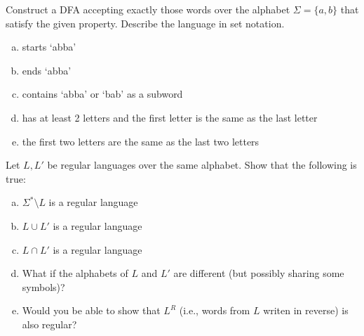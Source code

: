 \documentclass[a4paper,12pt]{amsart}
\begin{document}
\medskip\begin{problem}

    Construct a DFA accepting exactly those words over the alphabet $\Sigma=\{a,b\}$ that satisfy the given property. Describe the language in set notation.

    \medskip
    
    \begin{enumerate}[(a)]\setlength\itemsep{12pt}
        \item starts `abba'
        \item ends `abba'
        \item contains `abba' or `bab' as a subword
        \item has at least 2 letters and the first letter is the same as the last letter
        \item the first two letters are the same as the last two letters
    \end{enumerate}

\end{problem}


\medskip\begin{problem}

    Let $L,L'$ be regular languages over the same alphabet. Show that the following is true:
  
    \medskip
    
    \begin{enumerate}[(a)]\setlength\itemsep{12pt}
        \item $\Sigma^*\setminus L$ is a regular language
        \item $L\cup L'$ is a regular language
        \item $L\cap L'$ is a regular language
        \item What if the alphabets of $L$ and $L'$ are different (but possibly sharing some symbols)?
        \item Would you be able to show that  $L^R$ (i.e., words from $L$ writen in reverse) is also regular?
    \end{enumerate}
      
\end{problem}
\end{document}
